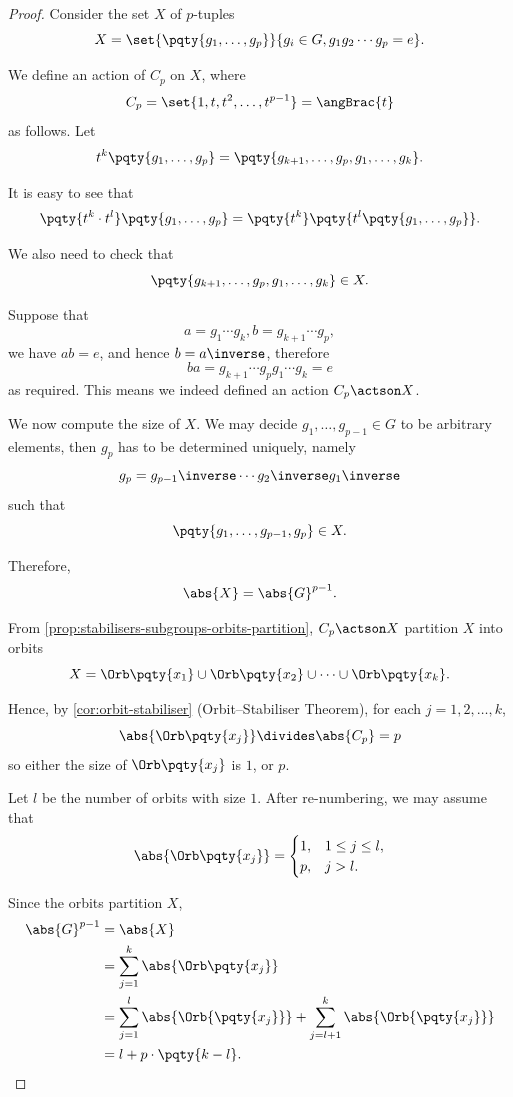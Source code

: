 \begin{proof}
    Consider the set \(X\) of \(p\)-tuples
    \[
        X = \set{\pqty{g_1, \ldots, g_p}}{g_i \in G, g_1 g_2 \cdots g_p = e}.
    \]

    We define an action of \(C_p\) on \(X\), where
    \[
        C_p = \set{1, t, t^2, \ldots, t^{p - 1}} = \angBrac{t}
    \]
    as follows. Let
    \[
        t^k \pqty{g_1, \ldots, g_p} = \pqty{g_{k + 1}, \ldots, g_p, g_1, \ldots, g_k}.
    \]

    It is easy to see that
    \[
        \pqty{t^k \cdot t^l} \pqty{g_1, \ldots, g_p} = \pqty{t^k} \pqty{t^l \pqty{g_1, \ldots, g_p}}.
    \]

    We also need to check that
    \[
        \pqty{g_{k + 1}, \ldots, g_p, g_1, \ldots, g_k} \in X.
    \]

    Suppose that
    \[
        a = g_1 \cdots g_k, b = g_{k + 1} \cdots g_p,
    \]
    we have \(ab = e\), and hence \(b = a\inverse\), therefore
    \[
        ba = g_{k + 1} \cdots g_p g_1 \cdots g_k = e
    \]
    as required. This means we indeed defined an action \(C_p \actson X\).

    We now compute the size of \(X\). We may decide \(g_1, \ldots, g_{p - 1} \in G\) to be arbitrary elements, then \(g_p\) has to be determined uniquely, namely
    \[
        g_p = g_{p - 1}\inverse \cdots g_2\inverse g_1\inverse
    \]
    such that
    \[
        \pqty{g_1, \ldots, g_{p - 1}, g_p} \in X.
    \]

    Therefore,
    \[
        \abs{X} = \abs{G}^{p - 1}.
    \]

    From \autoref{prop:stabilisers-subgroups-orbits-partition}, \(C_p \actson X\) partition \(X\) into orbits
    \[
        X = \Orb\pqty{x_1} \cup \Orb\pqty{x_2} \cup \cdots \cup \Orb\pqty{x_k}.
    \]

    Hence, by \autoref{cor:orbit-stabiliser} (Orbit--Stabiliser Theorem), for each \(j = 1, 2, \ldots, k\),
    \[
        \abs{\Orb\pqty{x_j}} \divides \abs{C_p} = p
    \]
    so either the size of \(\Orb\pqty{x_j}\) is \(1\), or \(p\).

    Let \(l\) be the number of orbits with size \(1\). After re-numbering, we may assume that
    \[
        \abs{\Orb\pqty{x_j}} = \begin{cases}
            1, & 1 \leq j \leq l, \\
            p, & j > l.
        \end{cases}
    \]

    Since the orbits partition \(X\),
    \begin{align*}
        \abs{G}^{p - 1} &= \abs{X} \\
        &= \sum_{j = 1}^{k} \abs{\Orb\pqty{x_j}} \\
        &= \sum_{j = 1}^{l} \abs{\Orb{\pqty{x_j}}} + \sum_{j = l + 1}^{k} \abs{\Orb{\pqty{x_j}}} \\
        &= l + p \cdot \pqty{k - l}.
    \end{align*}


\end{proof}
